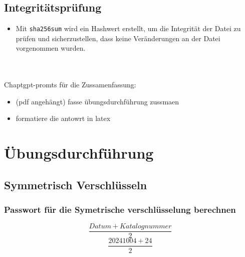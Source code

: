 \documentclass[a4paper]{article}
\begin{document}
\subsection{Integritätsprüfung}
\begin{itemize}
	\item Mit \texttt{sha256sum} wird ein Hashwert erstellt, um die Integrität der Datei zu prüfen und sicherzustellen, dass keine Veränderungen an der Datei vorgenommen wurden.
\end{itemize}
\\ \\
Chaptgpt-promts für die Zussamenfassung:
\begin{itemize}
	\item (pdf angehängt) fasse übungsdurchführung zussmaen
	\item formatiere die antowrt in latex
\end{itemize}

\newpage

\section{Übungsdurchführung}
\subsection{Symmetrisch Verschlüsseln}
\subsubsection{ Passwort für die Symetrische verschlüsselung berechnen}
$$\frac{Datum+Katalognummer}{2}$$
$$\frac{20241004+24}{2}$$
\end{document}
